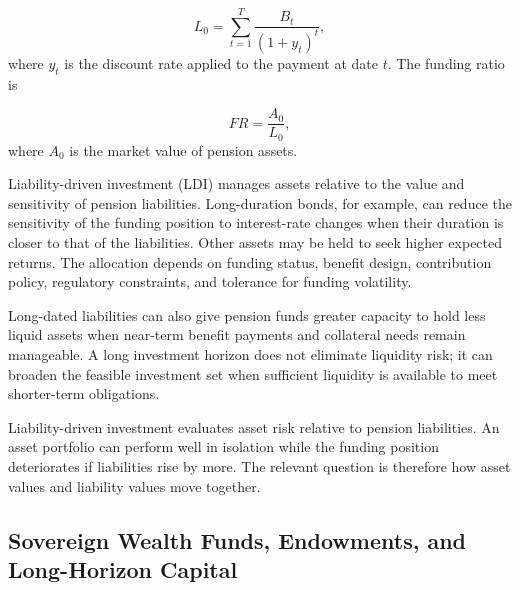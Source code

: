 \begin{equation}
L_0=\sum_{t=1}^{T}\frac{B_t}{(1+y_t)^t},
\label{eq:ch14-pension-liability-pv}
\end{equation}
where $y_t$ is the discount rate applied to the payment at date $t$. The funding ratio is

\begin{equation}
FR=\frac{A_0}{L_0},
\label{eq:ch14-pension-funding-ratio}
\end{equation}
where $A_0$ is the market value of pension assets.

Liability-driven investment (LDI) manages assets relative to the value and sensitivity of pension liabilities. Long-duration bonds, for example, can reduce the sensitivity of the funding position to interest-rate changes when their duration is closer to that of the liabilities. Other assets may be held to seek higher expected returns. The allocation depends on funding status, benefit design, contribution policy, regulatory constraints, and tolerance for funding volatility.

Long-dated liabilities can also give pension funds greater capacity to hold less liquid assets when near-term benefit payments and collateral needs remain manageable. A long investment horizon does not eliminate liquidity risk; it can broaden the feasible investment set when sufficient liquidity is available to meet shorter-term obligations.

\begin{tcolorbox}[
  enhanced,
  breakable,
  colback=white,
  colframe=FinanceBlue,
  boxrule=0.7pt,
  sharp corners,
  borderline west={2.2pt}{0pt}{FinanceBlue},
  title=\textbf{Financial Perspective: LDI Focuses on the Funding Position, Not Assets Alone},
  coltitle=white,
  colbacktitle=FinanceBlue,
  fonttitle=\bfseries,
  before skip=1.2em,
  after skip=1.2em
]

Liability-driven investment evaluates asset risk relative to pension liabilities. An asset portfolio can perform well in isolation while the funding position deteriorates if liabilities rise by more. The relevant question is therefore how asset values and liability values move together.

\end{tcolorbox}

\subsection{Sovereign Wealth Funds, Endowments, and Long-Horizon Capital}

